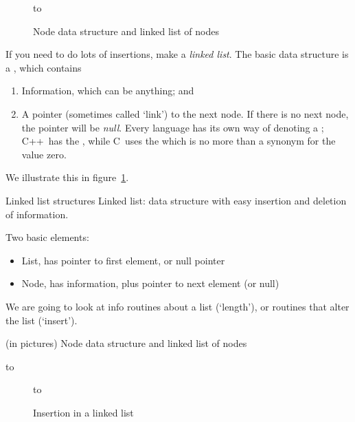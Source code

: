 \begin{figure}[ht]
\hbox to 
  \caption{Node data structure and linked list of nodes}
  \label{fig:linked-node-list}
\end{figure}

If you need to do lots of insertions, make a
\emph{linked list}. The basic data structure is a ,
which contains 
\begin{enumerate}
\item
  Information, which can be anything; and
\item A pointer (sometimes called `link') to the next node. If there
  is no next node, the pointer will be
  \emph{null}. Every language has its own way of
  denoting a ; C++~has the
  , while C~uses the  which is
  no more than a synonym for the value zero.
\end{enumerate}

We illustrate this in figure~\ref{fig:linked-node-list}.

\begin{slide}{Linked list structures}
  \label{sl:linkedlist}
  Linked list: data structure with easy insertion and deletion of
  information.

  Two basic elements:
  \begin{itemize}
  \item List, has pointer to first element, or null pointer
  \item Node, has information, plus pointer to next element (or null)
  \end{itemize}
  We are going to look at info routines about a list (`length'), or
  routines that alter the list (`insert').
\end{slide}
\begin{slide}{(in pictures)}
  \label{sl:linkedlist-pic}
  Node data structure and linked list of nodes
  
\hbox to 
\end{slide}

\begin{figure}[ht]
  \hbox to 
  \caption{Insertion in a linked list}
  \label{fig:linked-list-insert}
\end{figure}

